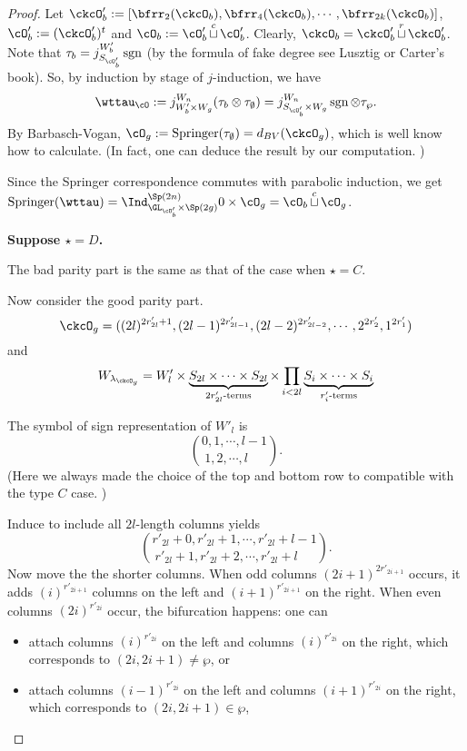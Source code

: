 \documentclass[12pt,a4paper]{amsart}
\newcommand{\sgn}{\operatorname{sgn}}
\numberwithin{equation}{section}
\theoremstyle{remark}
\def\lamckg{\lambda_{\ckcO_g}}
\def\cuprow{{\stackrel{r}{\sqcup}}}
\def\cupcol{{\stackrel{c}{\sqcup}}}
\def\Spr{\mathrm{Springer}}
\def\cuprow{{\,\stackrel{r}{\sqcup}\,}}
\def\cupcol{{\,\stackrel{c}{\sqcup}\,}}
\begin{document}
\begin{proof}
{      Let
      $\ckcO'_{b}: = [\bfrr_{2}(\ckcO_{b}), \bfrr_{4}(\ckcO_{b}),\cdots, \bfrr_{2k}(\ckcO_{b})]$,
      $\cO'_{b}:=(\ckcO'_{b})^{t}$ and $\cO_{b}:=\cO'_{b}\cupcol \cO'_{b}$.
      Clearly, $\ckcO_{b} = \ckcO'_{b}\cuprow \ckcO'_{b}$. Note that
      $\tau_{b} = j_{S_{\cO'_{b}}}^{W'_{b}} \sgn$ (by the formula of fake degree
      see Lusztig or Carter's book). So, by induction by stage of $j$-induction,
      we have
      \[
        \wttau_{\cO}:= j_{W'_{b}\times W_{g}}^{W_{n}} (\tau_{b}\otimes \tau_{\emptyset}) = j_{S_{\cO'_{b}}\times W_{g}}^{W_{n}} \sgn\otimes \tau_{\wp}.
      \]
      By Barbasch-Vogan, $\cO_{g}:=\Spr(\tau_{\emptyset}) = d_{BV}(\ckcO_{g})$,
      which is well know how to calculate. (In fact, one can deduce the result
      by our computation. )

      Since the Springer correspondence commutes with parabolic induction, we
      get
      $\Spr(\wttau) = \Ind_{\GL_{\cO'_{b}}\times \Sp(2g)}^{\Sp(2n)} 0\times \cO_{g} = \cO_{b}\cupcol \cO_{g}$.


      \medskip

      {\bf Suppose $\star=D$.}

      The bad parity part is the same as that of the case when $\star = C$.

      Now consider the good parity part.
      \[
        \ckcO_{g} = ((2l)^{2r'_{2l}+1}, (2l-1)^{2r'_{2l-1}}, (2l-2)^{2r'_{2l-2}}, \cdots, 2^{2r'_{2}}, 1^{2r'_{1}} )
      \]
      and
      \[
        W_{\lamckg} = W'_{l}\times \underbrace{S_{2l}\times \cdots \times S_{2l}}_{2r'_{2l}\text{-terms}} \times \prod_{i<2l} \underbrace{S_{i}\times \cdots\times S_{i}}_{r'_{i}\text{-terms}}
      \]

      The symbol of sign representation of $W'_{l}$ is
      \[
        \binom{0,1, \cdots, l-1}{1,2, \cdots, l\phantom{-1}}.
      \]
      (Here we always made the choice of the top and bottom row to compatible
      with the type $C$ case. )

      Induce to include all $2l$-length columns yields
      \[
        \binom{r'_{2l}+0,r'_{2l}+1, \cdots, r'_{2l}+l-1}{ r'_{2l}+1,r'_{2l}+2, \cdots, r'_{2l}+l\phantom{-1}}.
      \]
      Now move the the shorter columns. When odd columns $(2i+1)^{2r'_{2i+1}}$
      occurs, it adds $(i)^{r'_{2i+1}}$ columns on the left and
      $(i+1)^{r'_{2i+1}}$ on the right. When even columns $(2i)^{r'_{2i}}$
      occur, the bifurcation happens: one can
      \begin{itemize}
        \item attach columns $(i)^{r'_{2i}}$ on the left and columns
              $(i)^{r'_{2i}}$ on the right, which corresponds to
              $(2i,2i+1)\neq \wp$, or
        \item attach columns $(i-1)^{r'_{2i}}$ on the left and columns
              $(i+1)^{r'_{2i}}$ on the right, which corresponds to
              $(2i,2i+ 1)\in \wp$,
      \end{itemize}

}
\end{proof}
\end{document}
